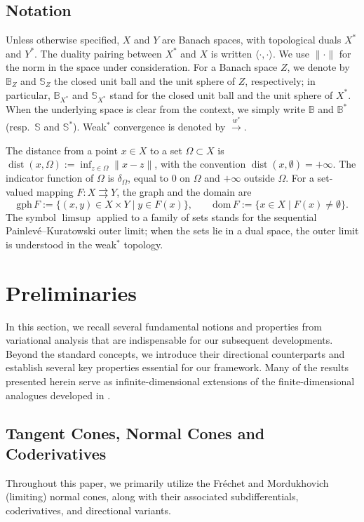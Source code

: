 \documentclass[12pt,twoside,reqno]{amsart}
\theoremstyle{definition}
\numberwithin{equation}{section}
\begin{document}
\subsection*{Notation}
Unless otherwise specified, $X$ and $Y$ are Banach spaces, with topological duals $X^*$ and $Y^*$. The duality pairing between $X^*$ and $X$ is written $\langle \cdot, \cdot \rangle$. We use $\|\cdot\|$ for the norm in the space under consideration. For a Banach space $Z$, we denote by $\mathbb{B}_Z$ and $\mathbb{S}_Z$ the closed unit ball and the unit sphere of $Z$, respectively; in particular, $\mathbb{B}_{X^*}$ and $\mathbb{S}_{X^*}$ stand for the closed unit ball and the unit sphere of $X^*$. When the underlying space is clear from the context, we simply write $\mathbb{B}$ and $\mathbb{B}^*$ (resp.\ $\mathbb{S}$ and $\mathbb{S}^*$). Weak\(^*\) convergence is denoted by $\xrightarrow{w^*}$.

The distance from a point $x\in X$ to a set $\Omega\subset X$ is $\operatorname{dist}(x,\Omega):=\inf_{z\in\Omega}\|x-z\|$, with the convention $\operatorname{dist}(x,\emptyset)=+\infty$. The indicator function of $\Omega$ is $\delta_\Omega$, equal to $0$ on $\Omega$ and $+\infty$ outside $\Omega$. For a set-valued mapping $F:X\rightrightarrows Y$, the graph and the domain are
\[
    \mathrm{gph}\, F := \bigl\{ (x,y)\in X\times Y \;\big|\; y\in F(x) \bigr\}, \qquad
    \mathrm{dom}\, F := \bigl\{ x\in X \;\big|\; F(x)\neq\emptyset \bigr\}.
\]
The symbol $\limsup$ applied to a family of sets stands for the sequential Painlev\'e--Kuratowski outer limit; when the sets lie in a dual space, the outer limit is understood in the weak\(^*\) topology.

\section{Preliminaries}\label{sec:preliminary}

In this section, we recall several fundamental notions and properties from variational analysis that are indispensable for our subsequent developments. Beyond the standard concepts, we introduce their directional counterparts and establish several key properties essential for our framework. Many of the results presented herein serve as infinite-dimensional extensions of the finite-dimensional analogues developed in \cite{gfrerer2013directional,benko2019calculus,Bai2023Directional}. 

\subsection{Tangent Cones, Normal Cones and Coderivatives}\label{subsec:prelim_variational}
Throughout this paper, we primarily utilize the Fr\'echet and Mordukhovich (limiting) normal cones, along with their associated subdifferentials, coderivatives, and directional variants.  
\end{document}

